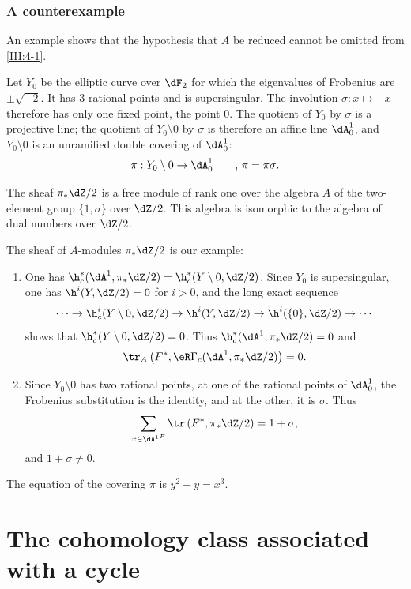 \subsection{A counterexample}\label{III:4-5}

An example shows that the hypothesis that $A$ be reduced cannot be omitted
from \ref{III:4-1}.

Let $Y_0$ be the elliptic curve over $\dF_2$ for which the eigenvalues of
Frobenius are $\pm \sqrt{-2}$. It has $3$ rational points and is
supersingular. The involution $\sigma:x\mapsto -x$ therefore has only one
fixed point, the point $0$. The quotient of $Y_0$ by $\sigma$ is a projective
line; the quotient of $Y_0\setminus 0$ by $\sigma$ is therefore an affine
line $\dA_0^1$, and $Y_0\setminus 0$ is an unramified double covering of
$\dA_0^1$:
\[
  \pi:Y_0\setminus 0 \to \dA_0^1 \qquad \text{, $\pi=\pi\sigma$.}
\]

The sheaf $\pi_*\dZ/2$ is a free module of rank one over the algebra $A$ of
the two-element group $\{1,\sigma\}$ over $\dZ/2$. This algebra is isomorphic
to the algebra of dual numbers over $\dZ/2$.

The sheaf of $A$-modules $\pi_*\dZ/2$ is our example:
\begin{enumerate}[\indent a)]
  \item One has
    $\h_c^*(\dA^1,\pi_*\dZ/2) = \h_c^*(Y\setminus 0,\dZ/2)$.
    Since $Y_0$ is supersingular, one has $\h^i(Y,\dZ/2)=0$ for $i>0$, and
    the long exact sequence
    \[
      \cdots \to \h_c^i(Y\setminus 0,\dZ/2) \to \h^i(Y,\dZ/2) \to \h^i(\{0\},\dZ/2) \to \cdots
    \]
    shows that $\h_c^*(Y\setminus 0,\dZ/2)=0$. Thus
    $\h_c^*(\dA^1,\pi_*\dZ/2)=0$ and
    \[
      \tr_A\left(F^*,\eR\Gamma_c(\dA^1,\pi_*\dZ/2)\right) = 0 \text{.}
    \]
  \item Since $Y_0\setminus 0$ has two rational points, at one of the
    rational points of $\dA_0^1$, the Frobenius substitution is the identity,
    and at the other, it is $\sigma$. Thus
    \[
      \sum_{x\in {\dA^1}^F} \tr\left(F^*,\pi_*\dZ/2\right) = 1+\sigma \text{,}
    \]
    and $1+\sigma\ne 0$.
\end{enumerate}

The equation of the covering $\pi$ is $y^2-y=x^3$.


\chapter{The cohomology class associated with a cycle}\label{IV}





